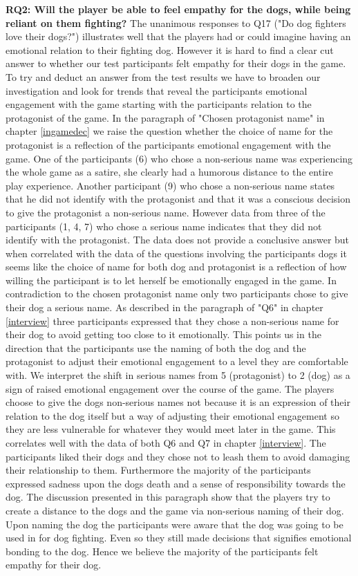 \textbf{RQ2:  Will the player be able to feel empathy for the dogs, while being reliant on them fighting?}
The unanimous responses to Q17 ("Do dog fighters love their dogs?") illustrates well that the players had or could imagine having an emotional relation to their fighting dog. However it is hard to find a clear cut answer to whether our test participants felt empathy for their dogs in the game. To try and deduct an answer from the test results we have to broaden our investigation and look for trends that reveal the participants emotional engagement with the game starting with the participants relation to the protagonist of the game. In the paragraph of "Chosen protagonist name" in chapter \ref{ingamedec} we raise the question whether the choice of name for the protagonist is a reflection of the participants emotional engagement with the game. One of the participants (6) who chose a non-serious name was experiencing the whole game as a satire, she clearly had a humorous distance to the entire play experience. Another participant (9) who chose a non-serious name states that he did not identify with the protagonist and that it was a conscious decision to give the protagonist a non-serious name. However data from three of the participants (1, 4, 7) who chose a serious name indicates that they did not identify with the protagonist. The data does not provide a conclusive answer but when correlated with the data of the questions involving the participants dogs it seems like the choice of name for both dog and protagonist is a reflection of how willing the participant is to let herself be emotionally engaged in the game. In contradiction to the chosen protagonist name only two participants chose to give their dog a serious name. As described in the paragraph of "Q6" in chapter \ref{interview} three participants expressed that they chose a non-serious name for their dog to avoid getting too close to it emotionally. This points us in the direction that the participants use the naming of both the dog and the protagonist to adjust their emotional engagement to a level they are comfortable with. We interpret the shift in serious names from 5 (protagonist) to 2 (dog) as a sign of raised emotional engagement over the course of the game. The players choose to give the dogs non-serious names not because it is an expression of their relation to the dog itself but a way of adjusting their emotional engagement so they are less vulnerable for whatever they would meet later in the game. This correlates well with the data of both Q6 and Q7 in chapter \ref{interview}. The participants liked their dogs and they chose not to leash them to avoid damaging their relationship to them. Furthermore the majority of the participants expressed sadness upon the dogs death and a sense of responsibility towards the dog. The discussion presented in this paragraph show that the players try to create a distance to the dogs and the game via non-serious naming of their dog. Upon naming the dog the participants were aware that the dog was going to be used in for dog fighting. Even so they still made decisions that signifies emotional bonding to the dog. Hence we believe the majority of the participants felt empathy for their dog. 



